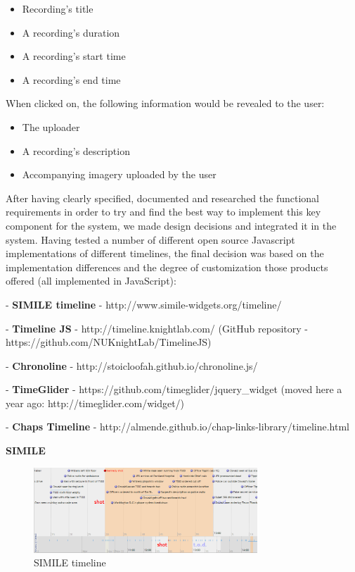 \documentclass{l3proj}
\begin{document}
\begin{itemize}
\item{Recording's title}
\item{A recording's duration}
\item{A recording's start time}
\item{A recording's end time}
\end{itemize}

When clicked on, the following information would be revealed to the user:
\begin{itemize}
\item{The uploader}
\item{A recording's description}
\item{Accompanying imagery uploaded by the user}
\end{itemize}

After having clearly specified, documented and researched the functional requirements in order to try and find the best way to implement this key component for the system, we made design decisions and integrated it in the system. Having tested a number of different open source Javascript implementations of different timelines, the final decision was based on the implementation differences and the degree of customization those products offered (all implemented in JavaScript):


- \textbf{SIMILE timeline} - http://www.simile-widgets.org/timeline/

- \textbf{Timeline JS} - http://timeline.knightlab.com/ (GitHub repository - https://github.com/NUKnightLab/TimelineJS)

- \textbf{Chronoline} - http://stoicloofah.github.io/chronoline.js/

- \textbf{TimeGlider} - https://github.com/timeglider/jquery_widget (moved here a year ago: http://timeglider.com/widget/)

- \textbf{Chaps Timeline} - http://almende.github.io/chap-links-library/timeline.html



\textbf{SIMILE}

\begin{figure}[ht!]
  \centering
\includegraphics[width=0.75\textwidth]{images/SIMILE.png}
\caption{SIMILE timeline}
\end{figure}
\end{document}
